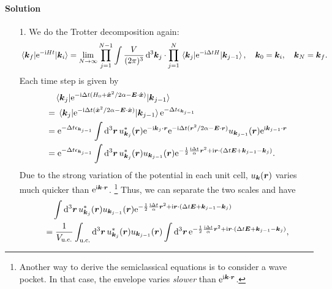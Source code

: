 \documentclass[hyperref, a4paper]{article}
\newcommand*{\ii}{\mathrm{i}}
\newcommand*{\ee}{\mathrm{e}}
\begin{document}
\paragraph{Solution} \begin{itemize}
\item[1.] We do the Trotter decomposition again:
\[
    \mel{\vb*{k}_f}{\ee^{- \ii H t}}{\vb*{k}_i} = \lim_{N \to \infty}
    \prod_{j=1}^{N-1} \int \frac{V}{(2\pi)^3} \dd[3]{\vb*{k}_j} \cdot \prod_{j=1}^{N} 
    \mel{\vb*{k}_j}{\ee^{- \ii \Delta t H}}{\vb*{k}_{j-1}}, \quad 
    \vb*{k}_{0} = \vb*{k}_i, \quad \vb*{k}_N = \vb*{k}_f.
\]
Each time step is given by 
\[
    \begin{aligned}
        &\quad \mel{\vb*{k}_j}{\ee^{- \ii \Delta t (H_0 + \hat{\vb*{x}}^2 / 2 \alpha - \vb*{E} \cdot \hat{\vb*{x}})}}{\vb*{k}_{j-1}} \\
        &= \mel{\vb*{k}_j}{\ee^{- \ii \Delta t ( \hat{\vb*{x}}^2 / 2 \alpha - \vb*{E} \cdot \hat{\vb*{x}})}}{\vb*{k}_{j-1}} \ee^{- \Delta t \epsilon_{\vb*{k}_{j-1}}} \\
        &= \ee^{- \Delta t \epsilon_{\vb*{k}_{j-1}}} \int \dd[3]{\vb*{r}} u^*_{\vb*{k}_j}(\vb*{r}) \ee^{- \ii \vb*{k}_j \cdot \vb*{r}}
        \ee^{- \ii \Delta t (\vb*{r}^2 / 2\alpha - \vb*{E} \cdot \vb*{r})} u_{\vb*{k}_{j-1}}(\vb*{r}) \ee^{\ii \vb*{k}_{j-1} \cdot \vb*{r}} \\
        &= \ee^{- \Delta t \epsilon_{\vb*{k}_{j-1}}} \int \dd[3]{\vb*{r}} u^*_{\vb*{k}_{j}}(\vb*{r}) u_{\vb*{k}_{j-1}}(\vb*{r})
        \ee^{- \frac{1}{2} \frac{\ii \Delta t}{\alpha} \vb*{r}^2 + \ii \vb*{r} \cdot (\Delta t \vb*{E} + \vb*{k}_{j-1} - \vb*{k}_j) }.
    \end{aligned}
\]
Due to the strong variation of the potential in each unit cell,
$u_{\vb*{k}}(\vb*{r})$ varies much quicker than $\ee^{\ii \vb*{k} \cdot \vb*{r}}$.%
\footnote{
    Another way to derive the semiclassical equations is to consider a wave pocket.
    In that case, the envelope varies \emph{slower} than $\ee^{\ii \vb*{k} \cdot \vb*{r}}$.
}
Thus, we can separate the two scales and have
\[
    \begin{aligned}
        &\quad \int \dd[3]{\vb*{r}} u^*_{\vb*{k}_{j}}(\vb*{r}) u_{\vb*{k}_{j-1}}(\vb*{r})
        \ee^{- \frac{1}{2} \frac{\ii \Delta t}{\alpha} \vb*{r}^2 + \ii \vb*{r} \cdot (\Delta t \vb*{E} + \vb*{k}_{j-1} - \vb*{k}_j) } \\
        &= \frac{1}{V_{\text{u.c.}}} \int_{\text{u.c.}} \dd[3]{\vb*{r}}
        u^*_{\vb*{k}_{j}}(\vb*{r}) u_{\vb*{k}_{j-1}}(\vb*{r})
        \int \dd[3]{\vb*{r}} \ee^{- \frac{1}{2} \frac{\ii \Delta t}{\alpha} \vb*{r}^2 + \ii \vb*{r} \cdot (\Delta t \vb*{E} + \vb*{k}_{j-1} - \vb*{k}_j) } ,

\end{aligned}\]
\end{itemize}
\end{document}
